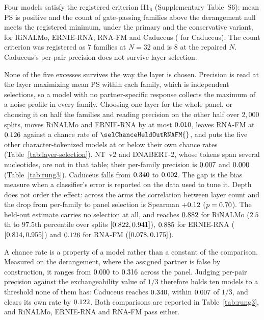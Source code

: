 \documentclass[11pt]{article}
\begin{document}
Four models satisfy the registered criterion H1$_6$
(Supplementary Table~S6): mean PS is positive and the count of gate-passing
families above the derangement null meets the registered minimum, under the
primary and the conservative variant, for RiNALMo, ERNIE-RNA, RNA-FM and
Caduceus (\nullCaduceus{} for Caduceus). The count criterion was registered as
7 families at $N = 32$ and is 8 at the repaired $N$. Caduceus's per-pair
precision does not survive layer selection.

None of the five excesses survives the way the layer is chosen. Precision is
read at the layer maximizing mean PS within each family, which is
\chanceRateN{} independent selections, so a model with no partner-specific
response collects the maximum of a noise profile in every family. Choosing one
layer for the whole panel, or choosing it on half the families and reading
precision on the other half over $2{,}000$ splits, moves RiNALMo and ERNIE-RNA
by at most $0.010{}$, leaves RNA-FM at $0.126{}$
against a chance rate of $\selChanceHeldOutRNAFM{}$, and puts the five other
character-tokenized models at or below their own chance rates
(Table~\ref{tab:layer-selection}). NT~v2 and DNABERT-2, whose
tokens span several nucleotides, are not in that table; their per-family
precision is $0.007{}$ and $0.000{}$
(Table~\ref{tab:rung3}). Caduceus falls from
$0.340{}$ to $0.002{}$. The gap is the bias
\citet{varma2006bias} measure when a classifier's error is reported on the data
used to tune it. Depth does not order the effect: across the \selectionArms{} arms the
correlation between layer count and the drop from per-family to panel selection
is Spearman $+0.12{}$ ($p = 0.70{}$). The held-out
estimate carries no selection at all, and reaches $0.882{}$ for
RiNALMo ($2.5$th to $97.5$th percentile over splits $[0.822, 0.941]{}$),
$0.885{}$ for ERNIE-RNA ($[0.814, 0.955]{}$) and
$0.126{}$ for RNA-FM ($[0.078, 0.175]{}$).



A chance rate is a property of a model rather than a constant of the comparison.
Measured on the derangement, where the assigned partner is false by
construction, it ranges from $0.000{}$ to $0.316{}$ across
the panel. Judging
per-pair precision against the exchangeability value of $1/3$ therefore holds
ten models to a threshold none of them has: Caduceus reaches
$0.340{}$, within $0.007{}$ of $1/3$, and clears
its own rate by $0.122{}$. Both comparisons are
reported in Table~\ref{tab:rung3}, and RiNALMo, ERNIE-RNA and RNA-FM pass
either.
\end{document}
